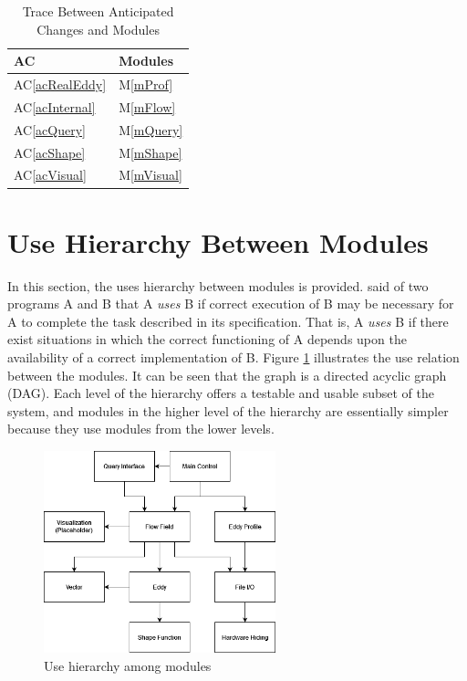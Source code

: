 \documentclass[12pt, titlepage]{article}
\newcommand{\acref}[1]{AC\ref{#1}}
\newcommand{\mref}[1]{M\ref{#1}}
\begin{document}
\begin{table}[H]
\centering
\begin{tabular}{p{} p{}}
\toprule
\textbf{AC} & \textbf{Modules}\\
\midrule
\acref{acRealEddy} & \mref{mProf}\\
\acref{acInternal} & \mref{mFlow}\\
\acref{acQuery} & \mref{mQuery}\\
\acref{acShape} & \mref{mShape}\\
\acref{acVisual} & \mref{mVisual}\\
\end{tabular}
\caption{Trace Between Anticipated Changes and Modules}
\label{TblACT}
\end{table}

\section{Use Hierarchy Between Modules} \label{SecUse}

In this section, the uses hierarchy between modules is
provided. \citet{Parnas1978} said of two programs A and B that A {\em uses} B if
correct execution of B may be necessary for A to complete the task described in
its specification. That is, A {\em uses} B if there exist situations in which
the correct functioning of A depends upon the availability of a correct
implementation of B.  Figure \ref{FigUH} illustrates the use relation between
the modules. It can be seen that the graph is a directed acyclic graph
(DAG). Each level of the hierarchy offers a testable and usable subset of the
system, and modules in the higher level of the hierarchy are essentially simpler
because they use modules from the lower levels.

\begin{figure}[H]
\centering
\includegraphics[width=0.6\textwidth]{UsesHierarchy.png}
\caption{Use hierarchy among modules}
\label{FigUH}
\end{figure}
\end{document}
